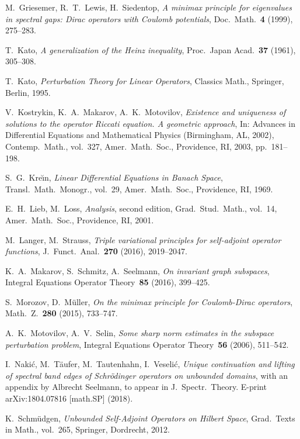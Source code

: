 \documentclass[11pt,a4paper]{amsart}
\numberwithin{equation}{section}
\theoremstyle{plain}
\theoremstyle{definition}
\theoremstyle{remark}
\begin{document}
\begin{thebibliography}{[10]}
   M.~Griesemer, R.~T.~Lewis, H.~Siedentop,
    \emph{A minimax principle for eigenvalues in spectral gaps: Dirac operators with Coulomb potentials},
    Doc.~Math.~\textbf{4} (1999), 275--283.

   T.~Kato,
    \emph{A generalization of the Heinz inequality},
    Proc.~Japan Acad.~\textbf{37} (1961), 305--308.

   T.~Kato,
    \emph{Perturbation Theory for Linear Operators},
    Classics Math., Springer, Berlin, 1995.

   V.~Kostrykin, K.~A.~Makarov, A.~K.~Motovilov,
    \emph{Existence and uniqueness of solutions to the operator Riccati equation. A geometric approach},
    In: Advances in Differential Equations and Mathematical Physics (Birmingham, AL, 2002),
    Contemp.~Math., vol.~327, Amer.~Math.~Soc., Providence, RI, 2003, pp.~181--198.

   S.~G.~Kre{\u\i}n,
    \emph{Linear Differential Equations in Banach Space},
    Transl.~Math.~Monogr., vol.~29, Amer.~Math.~Soc., Providence, RI, 1969.

   E.~H.~Lieb, M.~Loss,
    \emph{Analysis}, second edition,
    Grad.~Stud.~Math., vol.~14, Amer.~Math.~Soc., Providence, RI, 2001.

   M.~Langer, M.~Strauss,
    \emph{Triple variational principles for self-adjoint operator functions},
    J.~Funct.~Anal.~\textbf{270} (2016), 2019--2047.

   K.~A.~Makarov, S.~Schmitz, A.~Seelmann,
    \emph{On invariant graph subspaces},
    Integral Equations Operator Theory~\textbf{85} (2016), 399--425.

   S.~Morozov, D.~M\"uller,
    \emph{On the minimax principle for Coulomb-Dirac operators},
    Math.~Z.~\textbf{280} (2015), 733--747.

   A.~K.~Motovilov, A.~V.~Selin,
    \emph{Some sharp norm estimates in the subspace perturbation problem},
    Integral Equations Operator Theory~\textbf{56} (2006), 511--542.

   I.~Naki\'c, M.~T\"aufer, M.~Tautenhahn, I.~Veseli\'c,
    \emph{Unique continuation and lifting of spectral band edges of Schr\"odinger operators on unbounded domains},
    with an appendix by Albrecht Seelmann,
    to appear in J.~Spectr.~Theory. E-print arXiv:1804.07816 [math.SP] (2018).

   K.~Schm\"udgen,
    \emph{Unbounded Self-Adjoint Operators on Hilbert Space},
    Grad.~Texts in Math., vol.~265, Springer, Dordrecht, 2012.  


\end{thebibliography}
\end{document}
